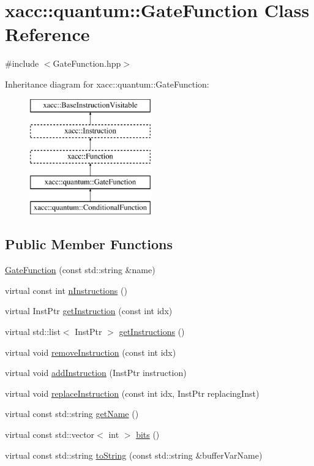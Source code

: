 \hypertarget{a01272}{}\section{xacc\+:\+:quantum\+:\+:Gate\+Function Class Reference}
\label{a01272}


{\ttfamily \#include $<$Gate\+Function.\+hpp$>$}

Inheritance diagram for xacc\+:\+:quantum\+:\+:Gate\+Function\+:\begin{figure}[H]
\begin{center}
\leavevmode
\includegraphics[height=5.000000cm]{a01272}
\end{center}
\end{figure}
\subsection*{Public Member Functions}
\begin{DoxyCompactItemize}
\item 
\hyperlink{a01272_a77545e72bd53268f609888654fcd8eee}{Gate\+Function} (const std\+::string \&name)
\item 
virtual const int \hyperlink{a01272_aa70b26156c060fec71316fe5e98bb102}{n\+Instructions} ()
\item 
virtual Inst\+Ptr \hyperlink{a01272_a841d656eed8aa9b4c0eec3f1da38069c}{get\+Instruction} (const int idx)
\item 
virtual std\+::list$<$ Inst\+Ptr $>$ \hyperlink{a01272_aebce6a9e64aed7f4aff86df752bacfe2}{get\+Instructions} ()
\item 
virtual void \hyperlink{a01272_a44ca35d081577de9ad2930f93c01e89d}{remove\+Instruction} (const int idx)
\item 
virtual void \hyperlink{a01272_a892fb69a10f0a7cb5abdab4cca61b80a}{add\+Instruction} (Inst\+Ptr instruction)
\item 
virtual void \hyperlink{a01272_a182fdfabbf546ae89e4f2384bafb45c9}{replace\+Instruction} (const int idx, Inst\+Ptr replacing\+Inst)
\item 
virtual const std\+::string \hyperlink{a01272_af42efb6191267164717d53c469e15d3a}{get\+Name} ()
\item 
virtual const std\+::vector$<$ int $>$ \hyperlink{a01272_aba03de68b76a9e120705c3c389c714a1}{bits} ()
\item 
virtual const std\+::string \hyperlink{a01272_aa1950776ae84bad2d0795a0441f910e7}{to\+String} (const std\+::string \&buffer\+Var\+Name)
\end{DoxyCompactItemize}
